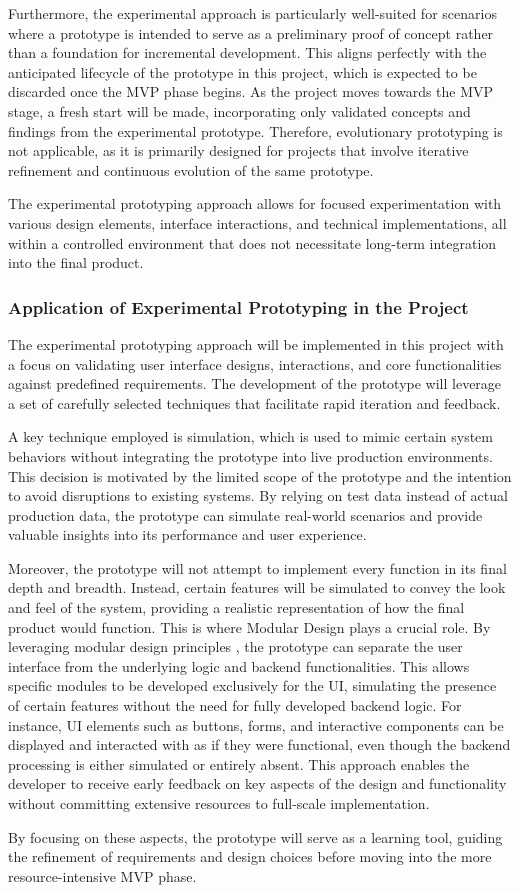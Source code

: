 Furthermore, the experimental approach is particularly well-suited for scenarios where a prototype is intended to serve
as a preliminary proof of concept rather than a foundation for incremental development. This aligns perfectly with the
anticipated lifecycle of the prototype in this project, which is expected to be discarded once the \ac{MVP} phase
begins. As the project moves towards the MVP stage, a fresh start will be made, incorporating only validated concepts
and findings from the experimental prototype. Therefore, evolutionary prototyping is not applicable, as it is primarily
designed for projects that involve iterative refinement and continuous evolution of the same prototype.

The experimental prototyping approach allows for focused experimentation with various design elements, interface
interactions, and technical implementations, all within a controlled environment that does not necessitate long-term
integration into the final product.

\subsubsection{Application of Experimental Prototyping in the Project}\label{subsubsec:ptapplication}

The experimental prototyping approach will be implemented in this project with a focus on validating user interface
designs, interactions, and core functionalities against predefined requirements. The development of the prototype will
leverage a set of carefully selected techniques that facilitate rapid iteration and feedback.

A key technique employed is simulation, which is used to mimic certain system behaviors without integrating the
prototype into live production environments. This decision is motivated by the limited scope of the prototype and the
intention to avoid disruptions to existing systems. By relying on test data instead of actual production data, the
prototype can simulate real-world scenarios and provide valuable insights into its performance and user experience.

Moreover, the prototype will not attempt to implement every function in its final depth and breadth. Instead, certain
features will be simulated to convey the look and feel of the system, providing a realistic representation of how the
final product would function. This is where Modular Design plays a crucial role. By leveraging modular design principles
, the prototype can separate the user interface from the underlying logic and backend functionalities. This allows
specific modules to be developed exclusively for the UI, simulating the presence of certain features without the need
for fully developed backend logic. For instance, UI elements such as buttons, forms, and interactive components can be
displayed and interacted with as if they were functional, even though the backend processing is either simulated or
entirely absent. This approach enables the developer to receive early feedback on key aspects of the
design and functionality without committing extensive resources to full-scale implementation.

By focusing on these aspects, the prototype will serve as a learning tool, guiding the refinement of requirements and
design choices before moving into the more resource-intensive MVP phase.
